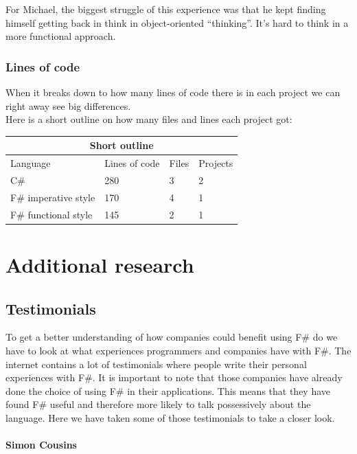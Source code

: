 \documentclass[12pt, a4paper]{article}
\begin{document}
For Michael, the biggest struggle of this experience was that he kept finding himself getting back in think in object-oriented “thinking”. It's hard to think in a more functional approach.\\
\subsubsection{Lines of code}
\label{linesOfCode}
When it breaks down to how many lines of code there is in each project we can right away see big differences.\\

Here is a short outline on how many files and lines each project got:\\

\begin{tabular}{ |p{4cm}|p{3cm}|p{2cm}|p{3cm}|  }
 \hline
 \multicolumn{4}{|c|}{Short outline} \\
 \hline
 Language & Lines of code & Files & Projects\\
 \hline
 C\# & 280 & 3 & 2\\
 F\# imperative style & 170 & 4 & 1\\
 F\# functional style & 145 & 2 & 1\\
 \hline
\end{tabular}

\newpage

\section{Additional research}

\subsection{Testimonials}

To get a better understanding of how companies could benefit using F\# do we have to look at what experiences programmers and companies have with F\#. The internet contains a lot of testimonials where people write their personal experiences with F\#. It is important to note that those companies have already done the choice of using F\# in their applications. This means that they have found F\# useful and therefore more likely to talk possessively about the language. Here we have taken some of those testimonials to take a closer look.

\paragraph{Simon Cousins}
\end{document}
